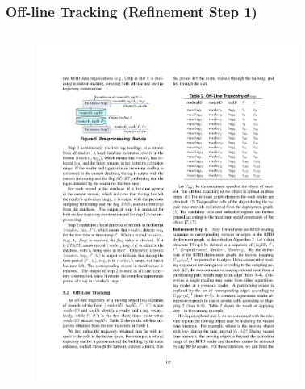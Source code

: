 
\begin{frame}
\frametitle{Off-line Tracking (Refinement Step 1)}

  \begin{columns}[c]

    \vspace{-15pt}
    \begin{figure}[tb]
      \includegraphics[width=0.92\columnwidth]{figures/2-1-9.pdf}
    \end{figure}
    \vspace{-20pt}
    \begin{figure}[tb]

\end{figure}
\end{columns}
\end{frame}
